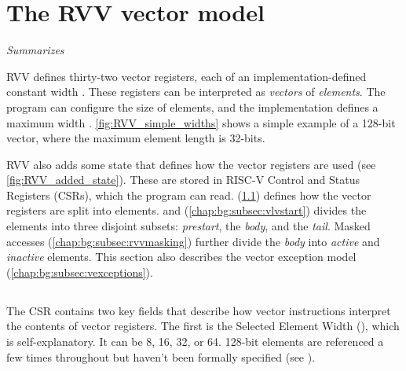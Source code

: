 \section{The RVV vector model}\label{chap:bg:sec:rvv:vector_model}
\emph{Summarizes \cite[Sections 1-6, 17]{RISCVVectorExtension2021}}


RVV defines thirty-two vector registers, each of an implementation-defined constant width .
These registers can be interpreted as \emph{vectors} of \emph{elements}.
The program can configure the size of elements, and the implementation defines a maximum width .
\cref{fig:RVV_simple_widths} shows a simple example of a 128-bit vector, where the maximum element length is 32-bits.

RVV also adds some state that defines how the vector registers are used (see \cref{fig:RVV_added_state}).
These are stored in RISC-V Control and Status Registers (CSRs), which the program can read.
 (\cref{chap:bg:subsec:vtype}) defines how the vector registers are split into elements.
 and  (\cref{chap:bg:subsec:vlvstart}) divides the elements into three disjoint subsets: \emph{prestart}, the \emph{body}, and the \emph{tail}.
Masked accesses (\cref{chap:bg:subsec:rvvmasking}) further divide the \emph{body} into \emph{active} and \emph{inactive} elements.
This section also describes the vector exception model (\cref{chap:bg:subsec:vexceptions}).

\subsection{}\label{chap:bg:subsec:vtype}
The  CSR contains two key fields that describe how vector instructions interpret the contents of vector registers.
The first is the Selected Element Width (), which is self-explanatory.
It can be 8, 16, 32, or 64.
128-bit elements are referenced a few times throughout but haven't been formally specified (see \cite[p32]{RISCVVectorExtension2021}).

